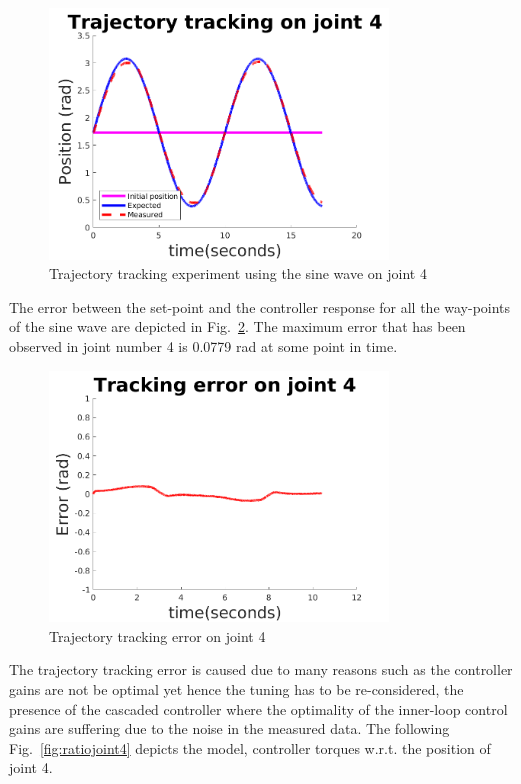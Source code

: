 \begin{figure}[H]
\centering
\includegraphics[width=90mm, trim=0 20 0 20]{pictures/joint4_trajectory}
\caption{Trajectory tracking experiment using the sine wave on joint 4}
\label{fig:trajectorytrackingjoint4}
\end{figure}

The error between the set-point and the controller response for all the way-points of the sine wave are depicted in Fig.~\ref{fig:trajectorytrackingerrorjoint4}. The maximum error that has been observed in joint number 4 is 0.0779 rad at some point in time. 

\begin{figure}[H]
\centering
\includegraphics[width=90mm, trim=0 20 0 20]{pictures/joint4_trajectoryerror}
\caption{Trajectory tracking error on joint 4}
\label{fig:trajectorytrackingerrorjoint4}
\end{figure}

The trajectory tracking error is caused due to many reasons such as the controller gains are not be optimal yet hence the tuning has to be re-considered, the presence of the cascaded controller where the optimality of the inner-loop control gains are suffering due to the noise in the measured data. The following Fig.~\ref{fig:ratiojoint4} depicts the model, controller torques w.r.t. the position of joint 4.

